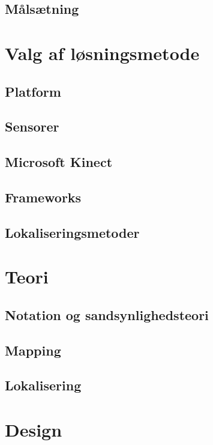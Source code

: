 \chapter*{Målsætning}

\clearpage

\part{Valg af løsningsmetode}

\chapter{Platform}

\chapter{Sensorer}

\chapter{Microsoft Kinect}

\chapter{Frameworks}


\chapter{Lokaliseringsmetoder}


\part{Teori}
\chapter{Notation og sandsynlighedsteori}

\chapter{Mapping}


\chapter{Lokalisering}


\part{Design}

